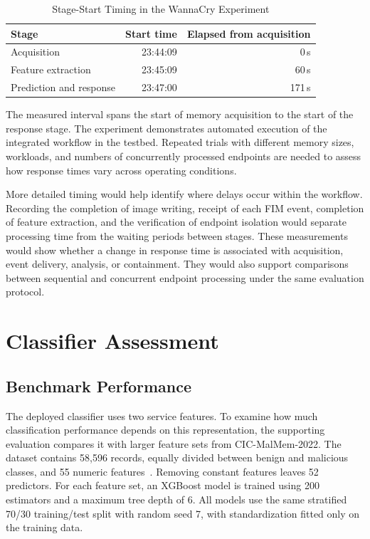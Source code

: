 \documentclass[conference]{IEEEtran}
\begin{document}
\begin{table}[t]
\caption{Stage-Start Timing in the WannaCry Experiment}
\label{tab:timing}
\centering
\small
\begin{tabular}{@{}lrr@{}}
\toprule
Stage & Start time & Elapsed from acquisition \\
\midrule
Acquisition & 23:44:09 & 0\,s \\
Feature extraction & 23:45:09 & 60\,s \\
Prediction and response & 23:47:00 & 171\,s \\
\bottomrule
\end{tabular}
\par\smallskip
\begin{minipage}{\columnwidth}\footnotesize
\end{minipage}
\end{table}

The measured interval spans the start of memory acquisition to the start of the response stage.
The experiment demonstrates automated execution of the integrated workflow in the testbed. Repeated trials with different memory sizes, workloads, and numbers of concurrently processed endpoints are
needed to assess how response times vary across operating conditions.

More detailed timing would help identify where delays occur within the workflow. Recording the completion of image writing, receipt of each FIM event, completion of feature extraction, and the verification of endpoint isolation would separate processing time from the waiting periods between stages. These measurements would show whether a change in response time is associated with acquisition, event delivery, analysis, or containment. They would also support comparisons between sequential and concurrent endpoint processing under the same evaluation protocol.

\section{Classifier Assessment}
\label{sec:assessment}

\subsection{Benchmark Performance}
The deployed classifier uses two service features. To examine how much
classification performance depends on this representation, the supporting
evaluation compares it with larger feature sets from CIC-MalMem-2022.
The dataset contains 58{,}596 records, equally divided between benign and
malicious classes, and 55 numeric features~\cite{carrier2022,cicmalmem}.
Removing constant features leaves 52 predictors. For each feature set,
an XGBoost model is trained using 200 estimators and a maximum tree depth
of 6. All models use the same stratified 70/30 training/test split with
random seed 7, with standardization fitted only on the training data.
\end{document}

